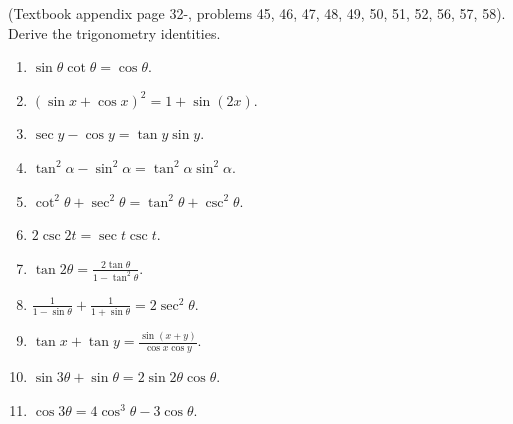(Textbook appendix page 32-, problems 45, 46, 47, 48, 49, 50, 51, 52, 56, 57, 58).
Derive the trigonometry identities.
\begin{multicols}{3}
\begin{enumerate}
\item $\sin \theta\cot \theta =\cos \theta$.
\item $(\sin x +\cos x)^2=1+\sin(2x)$.
\item $\sec y - \cos y= \tan y \sin y$.
\item $\tan^2 \alpha-\sin^2 \alpha=\tan^2\alpha\sin^2\alpha$.
\item $\cot^2\theta+\sec^2\theta=\tan^2\theta+\csc^2\theta$.
\item $2\csc 2t= \sec t \csc t$.
\item $\tan 2\theta =\frac{2\tan \theta}{1-\tan^2\theta} $.
\item $\frac{1}{1-\sin \theta}+ \frac{1}{1+\sin \theta}=2\sec^2\theta$.
\item $\tan x + \tan y = \frac{\sin (x+y)}{\cos x \cos y}$.
\item $\sin 3\theta +\sin \theta = 2 \sin 2\theta \cos \theta $.
\item $\cos 3\theta = 4\cos^3\theta-3\cos \theta $.
\end{enumerate} 
\end{multicols}
